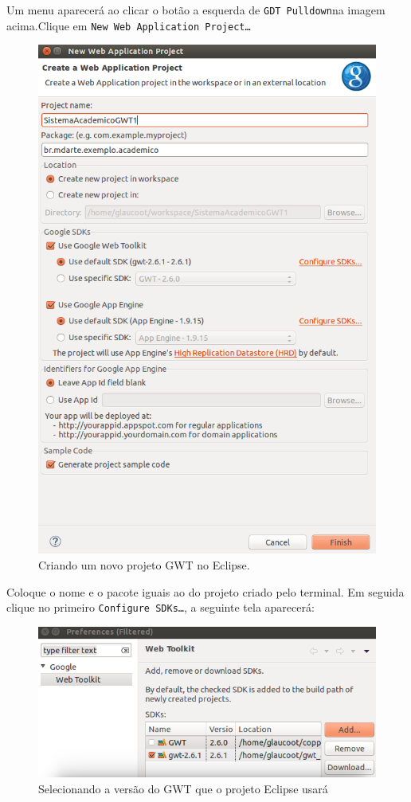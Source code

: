Um menu aparecerá ao clicar o botão a esquerda de \texttt{GDT Pulldown}na imagem acima.Clique em \texttt{New Web Application
Project\ldots}

\begin{figure}[H]
	\centering
	\includegraphics[scale=0.5]{files/imgs/gwt-01.png}
	\caption{Criando um novo projeto GWT no Eclipse.}
	\label{gwt01}
\end{figure}

Coloque o nome e o pacote iguais ao do projeto criado pelo terminal. Em seguida clique no primeiro \texttt{Configure SDKs\ldots},
a seguinte tela aparecerá:

\begin{figure}[H]
	\centering
	\includegraphics[scale=0.5]{files/imgs/gwt-02.png}
	\caption{Selecionando a versão do GWT que o projeto Eclipse usará}
	\label{gwt02}
\end{figure}

